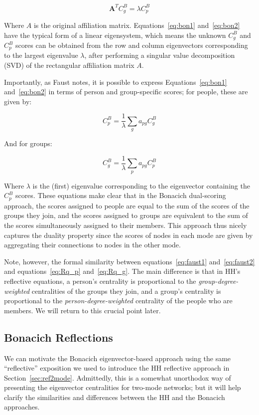 \documentclass[a4paper,fleqn]{cas-sc}
\begin{document}
\begin{equation}
    \mathbf{A}^TC^B_g = \lambda C^B_p 
    \label{eq:bon2}
\end{equation}

Where $A$ is the original affiliation matrix. Equations~\ref{eq:bon1} and~\ref{eq:bon2} have the typical form of a linear eigensystem, which means the unknown $C^B_g$ and $C^B_p$ scores can be obtained from the row and column eigenvectors corresponding to the largest eigenvalue $\lambda$, after performing a singular value decomposition (SVD) of the rectangular affiliation matrix $A$. 

Importantly, as Faust \citeyearpar[170]{faust1997centrality} notes, it is possible to express Equations~\ref{eq:bon1} and~\ref{eq:bon2} in terms of person and group-specific scores; for people, these are given by: 

\begin{equation}
    C^B_p = \frac{1}{\lambda}\sum_{g}a_{pg}C^B_g
    \label{eq:faust1}
\end{equation}

And for groups:

\begin{equation}
    C^B_g = \frac{1}{\lambda}\sum_{p}a_{pg}C^B_p
    \label{eq:faust2}
\end{equation}

Where $\lambda$ is the (first) eigenvalue corresponding to the eigenvector containing the $C^B_p$ scores. These equations make clear that in the Bonacich dual-scoring approach, the scores assigned to people are equal to the sum of the scores of the groups they join, and the scores assigned to groups are equivalent to the sum of the scores simultaneously assigned to their members. This approach thus nicely captures the duality property since the scores of nodes in each mode are given by aggregating their connections to nodes in the other mode. 

Note, however, the formal similarity between equations~\ref{eq:faust1} and~\ref{eq:faust2} and equations~\ref{eq:Rq_p} and~\ref{eq:Rq_g}. The main difference is that in HH's reflective equations, a person's centrality is proportional to the \textit{group-degree-weighted} centralities of the groups they join, and a group's centrality is proportional to the \textit{person-degree-weighted} centrality of the people who are members. We will return to this crucial point later.

\subsection{Bonacich Reflections} \label{subsec:bonref}
We can motivate the Bonacich eigenvector-based approach using the same ``reflective'' exposition we used to introduce the HH reflective approach in Section~\ref{sec:ref2mode}. Admittedly, this is a somewhat unorthodox way of presenting the eigenvector centralities for two-mode networks; but it will help clarify the similarities and differences between the HH and the Bonacich approaches. 
\end{document}
